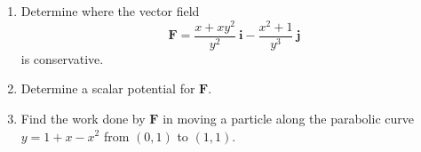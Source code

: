 \documentclass[12pt,letterpaper]{hmcpset}
\newcommand{\f}[2]{\frac{#1}{#2}}
\renewcommand{\bf}[1]{\mathbf{#1}}
\begin{document}
\begin{problem}[Colley 6.3.33]
    \begin{enumerate}
        \item Determine where the vector field
            \[
                \bf{F}=\f{x+xy^2}{y^2}~\bf{i}-\f{x^2+1}{y^3}~\bf{j}
            \]
            is conservative.
        \item Determine a scalar potential for $\bf{F}$.
        \item \begin{sloppypar} Find the work done by $\bf{F}$ in
            moving a particle along the parabolic curve ${y=1 +x-x^2}$
            from $(0,1)$ to $(1,1)$.\end{sloppypar}
    \end{enumerate}
\end{problem}
\begin{solution}
    \vfill
\end{solution}
\end{document}
